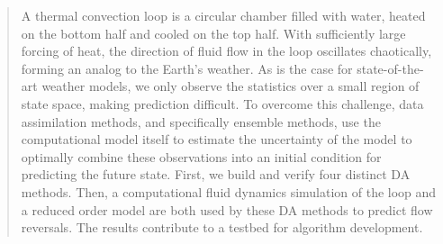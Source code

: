 \begin{abstract}
A thermal convection loop is a circular chamber filled with water, heated on the bottom half and cooled on the top half.
With sufficiently large forcing of heat, the direction of fluid flow in the loop oscillates chaotically, forming an analog to the Earth's weather.
As is the case for state-of-the-art weather models, we only observe the statistics over a small region of state space, making prediction difficult.
To overcome this challenge, data assimilation methods, and specifically ensemble methods, use the computational model itself to estimate the uncertainty of the model to optimally combine these observations into an initial condition for predicting the future state.
First, we build and verify four distinct DA methods.
Then, a computational fluid dynamics simulation of the loop and a reduced order model are both used by these DA methods to predict flow reversals.
The results contribute to a testbed for algorithm development.

\end{abstract}
